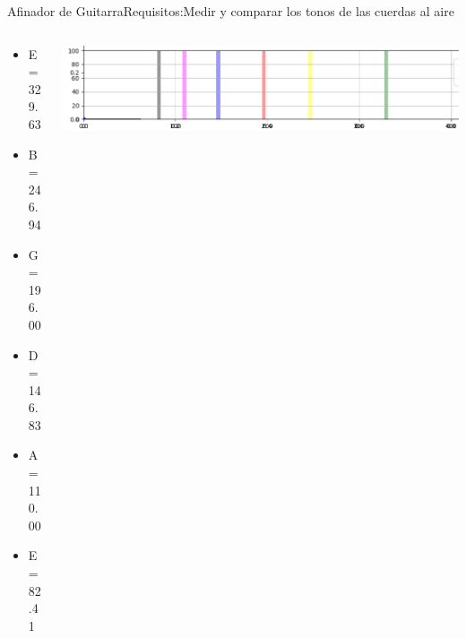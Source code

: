 \subtitle{Clase 7 - Ejemplo de presentación\\Afinador de guitarra con la CIAA}

\begin{frame}[c]
\maketitle
{}
\end{frame}
\begin{frame}[t]{Afinador de Guitarra}{Requisitos:Medir y comparar los tonos de las cuerdas al aire}
   \begin{columns}
      \begin{column}{.3\textwidth}
         \begin{itemize}
            \item{E=329.63}
            \item{B=246.94}
            \item{G=196.00}
            \item{D=146.83}
            \item{A=110.00}
            \item{E= 82.41}
         \end{itemize}
      \end{column}
      \begin{column}{.7\textwidth}
         \center\includegraphics[width=1.0\textwidth]{7_clase/chords_frec}
      \end{column}
   \end{columns}
   \vfill
   \note{
      \begin{itemize}
         \item{}
         \item{}
      \end{itemize}
   }
\end{frame}
